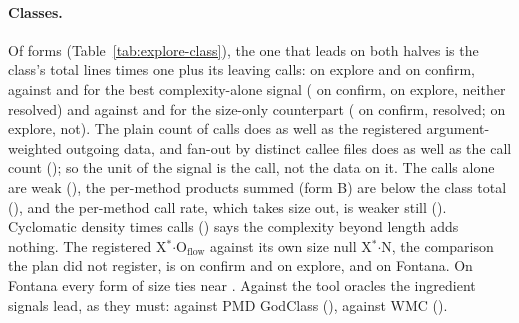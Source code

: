 \documentclass[11pt,a4paper]{article}
\newcommand{\madz}{modified $z \geq 3.5$}
\newcommand{\fitwidth}[1]{\resizebox{\ifdim\width>\textwidth\textwidth\else\width\fi}{!}{#1}}
\newcommand{\Xs}{X$^*$}
\newcommand{\Oflow}{O$_{\text{flow}}$}
\begin{document}
\begin{table}[t]
\centering
\caption{Exploratory, post hoc: class forms built from size and outgoing
calls, pooled MCC against MLCQ human Blob on each half and against Fontana's
God Class, by \madz{}. ``Leaving calls'' is the number of call sites in the
class that resolve to the repository's own code outside the class, each call
one unit; ``fan-out'' the number of distinct callee files. The paired
differences are against Halstead volume summed (the best complexity-alone
signal) and against lines summed $\times$ number of methods (size only), on
the confirm half.}
\label{tab:explore-class}
\footnotesize
\setlength{\tabcolsep}{3pt}
\fitwidth{}
\end{table}

\paragraph{Classes.} Of \expClassForms{} forms (Table~\ref{tab:explore-class}),
the one that leads on both halves is the class's total lines times one plus
its leaving calls: \expSizeCallsExploreMcc{} on explore and
\expSizeCallsConfirmMcc{} on confirm, against \expComplexityExploreMcc{}
and \expComplexityConfirmMcc{} for the best complexity-alone signal
(\expSizeCallsConfirmVsComplexity{} on confirm, \expSizeCallsExploreVsComplexity{}
on explore, neither resolved) and against \expSizeOnlyExploreMcc{} and
\expSizeOnlyConfirmMcc{} for the size-only counterpart
(\expSizeCallsConfirmVsSize{} on confirm, resolved;
\expSizeCallsExploreVsSize{} on explore, not). The plain count of calls does
as well as the registered argument-weighted outgoing data, and fan-out by
distinct callee files does as well as the call count
(\expSizeFanConfirmMcc{}); so the unit of the signal is the call, not the
data on it. The calls alone are weak (\expCallsAloneConfirmMcc{}), the
per-method products summed (form B) are below the class total
(\expFormBSumConfirmMcc{}), and the per-method call rate, which takes size
out, is weaker still (\expRateConfirmMcc{}). Cyclomatic density times calls
(\expDensityCallsConfirmMcc{}) says the complexity beyond length adds
nothing. The registered \Xs$\cdot$\Oflow{} against its own size null
\Xs$\cdot$N, the comparison the plan did not register, is
\expXOConfirmVsSizeMax{} on confirm and \expXOExploreVsSizeMax{} on explore,
and \expXOFontanaVsSizeMax{} on Fontana. On Fontana every form of size ties
near \expFontanaComplexityMcc{}. Against the tool oracles the ingredient
signals lead, as they must: \expToolPmdTop{} against PMD GodClass
(\expToolPmdTopMcc{}), \expToolWmcTop{} against WMC (\expToolWmcTopMcc{}).
\end{document}
